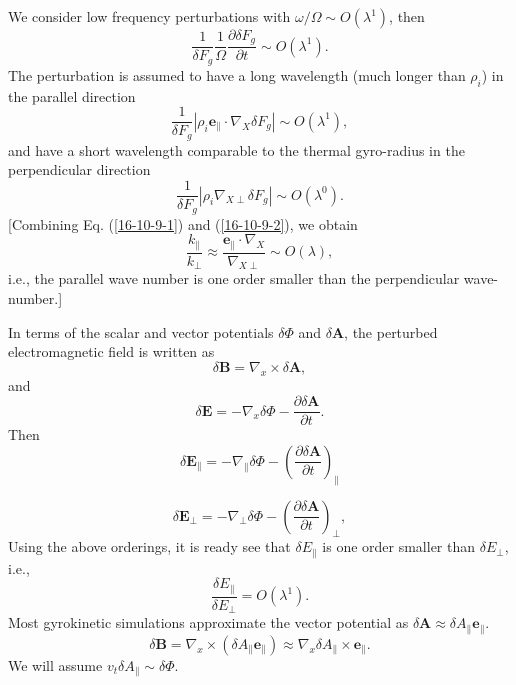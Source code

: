 \documentclass{article}
\begin{document}
We consider low frequency perturbations with $\omega / \Omega \sim O
(\lambda^1)$, then
\begin{equation}
  \frac{1}{\delta F_g} \frac{1}{\Omega} \frac{\partial \delta F_g}{\partial t}
  \sim O (\lambda^1) .
\end{equation}
The perturbation is assumed to have a long wavelength (much longer than
$\rho_i$) in the parallel direction
\begin{equation}
  \label{16-10-9-1} \frac{1}{\delta F_g} | \rho_i \mathbf{e}_{\parallel} \cdot
  \nabla_X \delta F_g | \sim O (\lambda^1),
\end{equation}
and have a short wavelength comparable to the thermal gyro-radius in the
perpendicular direction
\begin{equation}
  \label{16-10-9-2} \frac{1}{\delta F_g} | \rho_i \nabla_{X \perp} \delta F_g
  | \sim O (\lambda^0) .
\end{equation}
[Combining Eq. (\ref{16-10-9-1}) and (\ref{16-10-9-2}), we obtain
\begin{equation}
  \frac{k_{\parallel}}{k_{\perp}} \approx \frac{\mathbf{e}_{\parallel} \cdot
  \nabla_X}{\nabla_{X \perp}} \sim O (\lambda),
\end{equation}
i.e., the parallel wave number is one order smaller than the perpendicular
wave-number.]

In terms of the scalar and vector potentials $\delta \Phi$ and $\delta
\mathbf{A}$, the perturbed electromagnetic field is written as
\begin{equation}
  \delta \mathbf{B}= \nabla_x \times \delta \mathbf{A},
\end{equation}
and
\begin{equation}
  \label{18-3-6-a7} \delta \mathbf{E}= - \nabla_x \delta \Phi - \frac{\partial
  \delta \mathbf{A}}{\partial t} .
\end{equation}
Then
\begin{equation}
  \delta \mathbf{E}_{\parallel} = - \nabla_{\parallel} \delta \Phi - \left(
  \frac{\partial \delta \mathbf{A}}{\partial t} \right)_{\parallel}
\end{equation}

\begin{equation}
  \delta \mathbf{E}_{\perp} = - \nabla_{\perp} \delta \Phi - \left(
  \frac{\partial \delta \mathbf{A}}{\partial t} \right)_{\perp},
\end{equation}
Using the above orderings, it is ready see that $\delta E_{\parallel}$ is one
order smaller than $\delta E_{\perp}$, i.e.,
\begin{equation}
  \frac{\delta E_{\parallel}}{\delta E_{\perp}} = O (\lambda^1) .
\end{equation}
Most gyrokinetic simulations approximate the vector potential as $\delta
\mathbf{A} \approx \delta A_{\parallel} \mathbf{e}_{\parallel}$.
\begin{equation}
  \delta \mathbf{B}= \nabla_x \times (\delta A_{\parallel}
  \mathbf{e}_{\parallel}) \approx \nabla_x \delta A_{\parallel} \times
  \mathbf{e}_{\parallel} .
\end{equation}
We will assume $v_t \delta A_{\parallel} \sim \delta \Phi$.
\end{document}
